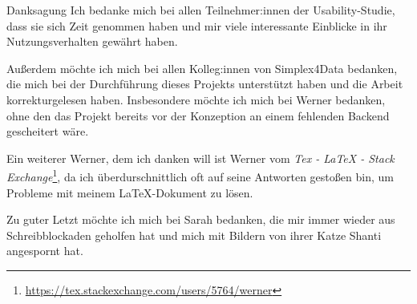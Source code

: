 \vspace*{0pt plus 1fill}
\begin{tucsimplesection}{Danksagung}
  Ich bedanke mich bei allen Teilnehmer:innen der Usability-Studie, dass sie sich Zeit genommen haben und mir viele interessante Einblicke in ihr Nutzungsverhalten gewährt haben.

  Außerdem möchte ich mich bei allen Kolleg:innen von Simplex4Data bedanken, die mich bei der Durchführung dieses Projekts unterstützt haben und die Arbeit korrekturgelesen haben. Insbesondere möchte ich mich bei Werner bedanken, ohne den das Projekt bereits vor der Konzeption an einem fehlenden Backend gescheitert wäre.

  Ein weiterer Werner, dem ich danken will ist Werner vom \textit{Tex - LaTeX - Stack Exchange}\footnote{\url{https://tex.stackexchange.com/users/5764/werner}}, da ich überdurschnittlich oft auf seine Antworten gestoßen bin, um Probleme mit meinem \LaTeX{}-Dokument zu lösen.

  Zu guter Letzt möchte ich mich bei Sarah bedanken, die mir immer wieder aus Schreibblockaden geholfen hat und mich mit Bildern von ihrer Katze Shanti angespornt hat.
\end{tucsimplesection}
\vspace*{0pt plus 2.5fill}

